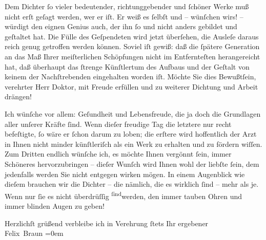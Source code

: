 \pstart
           {\pb}Dem Dichter{ }ſo vieler bedeutender, richtunggebender
               und{ }ſchöner Werke muß nicht erſt geſagt werden, wer er iſt. Er weiß es{ }ſelbſt und –
               wünſchen wirs! – würdigt den eignen Genius auch, der ihn{ }ſo und nicht anders gebildet
               und geſtaltet hat. Die Fülle des Geſpendeten wird jetzt überſehen, die Ausleſe daraus
               reich genug getroffen werden können. Soviel iſt gewiß: daß die{ }ſpätere Generation an
               das Maß Ihrer meiſterlichen Schöpfungen nicht im Entfernteſten herangereicht hat, daß
               überhaupt das{ }ſtrenge Künſtlertum des Aufbaus und der Geſtalt von keinem der
               Nachſtrebenden eingehalten worden iſt. Möchte Sie dies Bewußtſein, verehrter Herr
               Doktor, mit Freude erfüllen und zu weiterer Dichtung und Arbeit drängen!\pend
           
\pstart
           Ich wünſche vor allem: Geſundheit und Lebensfreude, die ja doch die Grundlagen aller
               unſerer Kräfte{ }ſind. Wenn dieſer freudige {\pb}Tag die
               letztere nur recht befeſtigte,{ }ſo wäre er{ }ſchon darum zu loben; die erſtere wird
               hoffentlich der Arzt in Ihnen nicht minder künſtleriſch als ein Werk zu erhalten und
               zu fördern wiſſen. Zum Dritten endlich wünſche ich, es möchte Ihnen vergönnt{ }ſein,
               immer Schöneres hervorzubringen – dieſer Wunſch wird Ihnen wohl der liebſte{ }ſein, dem
               jedenfalls werden Sie nicht entgegen wirken mögen. In einem Augenblick wie dieſem
               brauchen wir die Dichter – die nämlich, die es wirklich{ }ſind – mehr als je. Wenn nur{ }ſie es nicht überdrüſſig \substVorne{}\textsuperscript{ſind}\substDazwischen{}werden\substHinten{}, den immer tauben Ohren und immer blinden Augen zu geben!\pend
           
\pstart
           Herzlichſt grüßend verbleibe ich in Verehrung{ }ſtets Ihr ergebener{\\[\baselineskip]}\spacefill\mbox{Felix Braun}\pend
           \leftskip=0em{}\endnumbering{}  \newcommand{\dateiname}{L02381}\newcommand{\titel}{Felix Braun an Arthur Schnitzler, 13. 5. 1922}\newcommand{\editorInnen}{Martin Anton Müller und Gerd-Hermann Susen}
